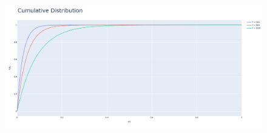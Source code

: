 \documentclass[12pt]{article}
\begin{document}
    \begin{figure}
        \centering
        \includegraphics[width=\linewidth]{fig3.png}
    \end{figure}
\end{document}
